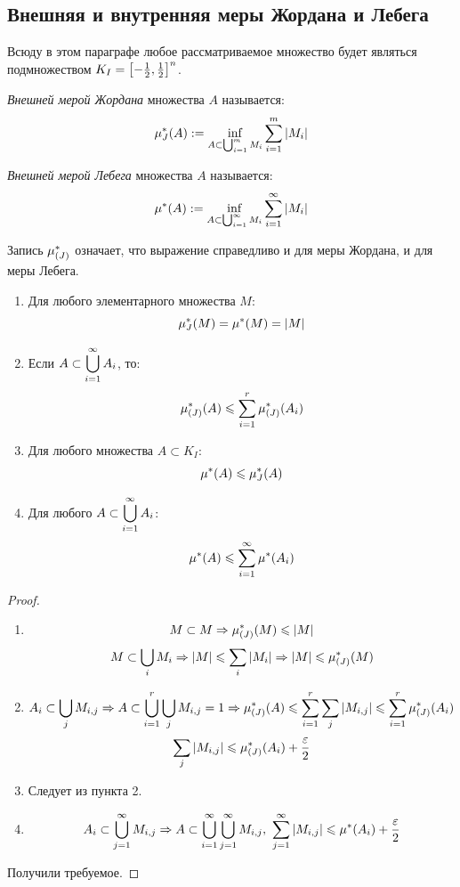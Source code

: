 \subsection{Внешняя и внутренняя меры Жордана и Лебега}
\begin{note}
	Всюду в этом параграфе любое рассматриваемое множество будет являться подмножеством $K_I=\left[-\frac12,\frac12\right]^n$.
\end{note}
\begin{definition}
	\textit{Внешней мерой Жордана} множества $A$ называется: \[\mj(A):=\inf_{A\subset\bigcup_{i=1}^mM_i}\sum_{i=1}^m|M_i|\]
\end{definition}
\begin{definition}
	\textit{Внешней мерой Лебега} множества $A$ называется:
	\[\m(A):=\inf_{A\subset\bigcup_{i=1}^\i M_i}\sum_{i=1}^\i|M_i|\]
\end{definition}
\begin{note}
	Запись $\mu_{(J)}^*$ означает, что выражение справедливо и для меры Жордана, и для меры Лебега.
\end{note}
\begin{theorem}\label{20_th1}
	\begin{enumerate}
		\item Для любого элементарного множества $M$:
		\[\mu_{J}^*(M)=\mu^*(M)=|M|\]
		\item Если $\displaystyle A\subset\bigcup_{i=1}^\infty A_i$, то:
		\[\ma(A)\le\sum_{i=1}^r\ma(A_i)\]
		\item Для любого множества $A\subset K_I$:
		\[\mu^*(A)\leqslant\mu_{J}^*(A)\]
		\item Для любого $\displaystyle A\subset\bigcup_{i=1}^\infty A_i$:
		\[\m(A)\le\sum_{i=1}^\i\m(A_i)\]
	\end{enumerate}
\end{theorem}
\begin{proof}
	\begin{enumerate}
		\item \[M\subset M\Rightarrow\mu_{(J)}^*(M)\leqslant|M|\]
		\[M\subset\bc_iM_i\Ra|M|\le\sum_i|M_i|\Ra|M|\le\ma(M)\]
		\item \[A_i\subset\bc_jM_{i,j}\Ra A\subset\bc_{i=1}^r\bc_jM_{i,j}=1\Ra\ma(A)\le\sum_{i=1}^r\sum_j|M_{i,j}|\le\sum_{i=1}^r\ma(A_i)\]
		\[\sum_j|M_{i,j}|\le\ma(A_i)+\frac\eps2\]
		\item Следует из пункта 2.
		\item \[A_i\subset\bc_{j=1}^\i M_{i,j}\Ra A\subset\bc_{i=1}^\i\bc_{j=1}^\i M_{i,j},\ \sum_{j=1}^\i|M_{i,j}|\le\m(A_i)+\frac\eps2\]
	\end{enumerate}
	Получили требуемое.
\end{proof}
